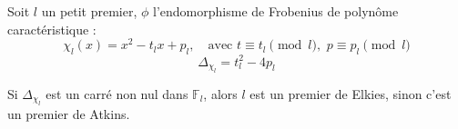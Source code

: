 \documentclass{beamer}
\begin{document}
\begin{frame}
Soit $l$ un petit premier, $\phi$ l'endomorphisme de Frobenius de polynôme caractéristique :
$$\chi_l(x) = x^2 - t_lx +p_l, \quad \text{avec } t \equiv t_l \pmod l , \, \,p \equiv p_l \pmod l$$ 
\newline 
$$\Delta_{\chi_l} = t_l^2 -4p_l $$
\begin{definition}
Si $\Delta_{\chi_l}$ est un carré non nul dans $\mathbb{F}_l$, alors $l$ est un premier de Elkies, sinon c'est un premier de Atkins.
\end{definition}
\end{frame}
\end{document}
